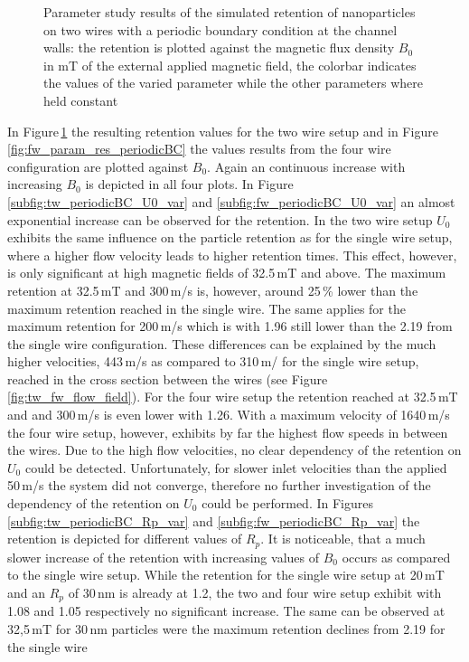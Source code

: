 \begin{figure}
        \caption[Parameter study results of the simulated retention of nanoparticles on two wires with a periodic boundary condition at the channel walls]{Parameter study results of the simulated retention of nanoparticles on two wires with a periodic boundary condition at the channel walls: the retention is plotted against the magnetic flux density $B_{0}$ in mT of the external applied magnetic field, the colorbar indicates the values of the varied parameter while the other parameters where held constant }
        \label{fig:tw_param_res_periodicBC}
  \end{figure}

In Figure\,\ref{fig:tw_param_res_periodicBC} the resulting retention values for the two wire setup and in Figure \,\ref{fig:fw_param_res_periodicBC} the values results from the four wire configuration are plotted against $B_{0}$. Again an continuous increase with increasing $B_{0}$ is depicted in all four plots. In Figure \ref{subfig:tw_periodicBC_U0_var} and \ref{subfig:fw_periodicBC_U0_var} an almost exponential increase can be observed for the retention. In the two wire setup $U_{0}$ exhibits the same influence on the particle retention as for the single wire setup, where a higher flow velocity leads to higher retention times. This effect, however, is only significant at high magnetic fields of 32.5\,mT and above. The maximum retention at 32.5\,mT and 300\,\textmu m/s is, however, around 25\,\% lower than the maximum retention reached in the single wire. The same applies for the maximum retention for 200\,\textmu m/s which is with 1.96 still lower than the 2.19 from the single wire configuration. These differences can be explained by the much higher velocities, 443\,\textmu m/s as compared to 310\,\textmu m/ for the single wire setup, reached in the cross section between the wires (see Figure \ref{fig:tw_fw_flow_field}). For the four wire setup the retention reached at 32.5\,mT and and 300\,\textmu m/s is even lower with 1.26. With a maximum velocity of 1640\,\textmu m/s the four wire setup, however, exhibits by far the highest flow speeds in between the wires. Due to the high flow velocities, no clear dependency of the retention on $U_{0}$ could be detected. Unfortunately, for slower inlet velocities than the applied 50\,\textmu m/s the system did not converge, therefore no further investigation of the dependency of the retention on $U_{0}$ could be performed. \newline
In Figures\,\ref{subfig:tw_periodicBC_Rp_var} and \ref{subfig:fw_periodicBC_Rp_var} the retention is depicted for different values of $R_{p}$. It is noticeable, that a much slower increase of the retention with increasing values of $B_{0}$ occurs as compared to the single wire setup. While the retention for the single wire setup at 20\,mT and an $R_{p}$ of 30\,nm is already at 1.2, the two and four wire setup exhibit with 1.08 and 1.05 respectively no significant increase. The same can be observed at 32,5\,mT for 30\,nm particles were the maximum retention declines from 2.19 for the single wire  
